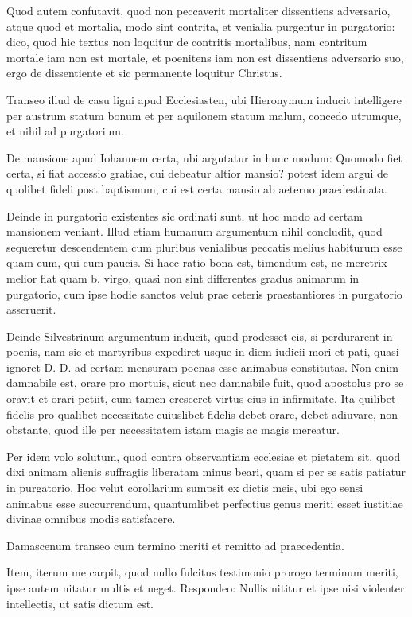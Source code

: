 Quod autem confutavit, quod non peccaverit mortaliter dissentiens adversario, atque quod et mortalia, modo sint contrita, et venialia purgentur in purgatorio: dico, quod hic textus non loquitur de contritis mortalibus, nam contritum mortale iam non est mortale, et poenitens iam non est dissentiens adversario suo, ergo de dissentiente et sic permanente loquitur Christus.

Transeo illud de casu ligni apud Ecclesiasten, ubi Hieronymum inducit intelligere per austrum statum bonum et per aquilonem statum malum, concedo utrumque, et nihil ad purgatorium.

De mansione apud Iohannem certa, ubi argutatur in hunc modum: Quomodo fiet certa, si fiat accessio gratiae, cui debeatur altior mansio? potest idem argui de quolibet fideli post baptismum, cui est certa mansio ab aeterno praedestinata.

Deinde in purgatorio existentes sic ordinati sunt, ut hoc modo ad certam mansionem veniant. Illud etiam humanum argumentum nihil concludit, quod sequeretur descendentem cum pluribus venialibus peccatis melius habiturum esse quam eum, qui cum paucis. Si haec ratio bona est, timendum est, ne meretrix melior fiat quam b. virgo, quasi non sint differentes gradus animarum in purgatorio, cum ipse hodie sanctos velut prae ceteris praestantiores in purgatorio asseruerit.

Deinde Silvestrinum argumentum inducit, quod prodesset eis, si perdurarent in poenis, nam sic et martyribus expediret usque in diem iudicii mori et pati, quasi ignoret D. D. ad certam mensuram poenas esse animabus constitutas. Non enim damnabile est, orare pro mortuis, sicut nec damnabile fuit, quod apostolus pro se oravit et orari petiit, cum tamen cresceret virtus eius in infirmitate. Ita quilibet fidelis pro qualibet necessitate cuiuslibet fidelis debet orare, debet adiuvare, non obstante, quod ille per necessitatem istam magis ac magis mereatur.

Per idem volo solutum, quod contra observantiam ecclesiae et pietatem sit, quod dixi animam alienis suffragiis liberatam minus beari, quam si per \marginpar{\small[341]} se satis patiatur in purgatorio. Hoc velut corollarium sumpsit ex dictis meis, ubi ego sensi animabus esse succurrendum, quantumlibet perfectius genus meriti esset iustitiae divinae omnibus modis satisfacere.

Damascenum transeo cum termino meriti et remitto ad praecedentia.

Item, iterum me carpit, quod nullo fulcitus testimonio prorogo terminum meriti, ipse autem nitatur multis et neget. Respondeo: Nullis nititur et ipse nisi violenter intellectis, ut satis dictum est.

